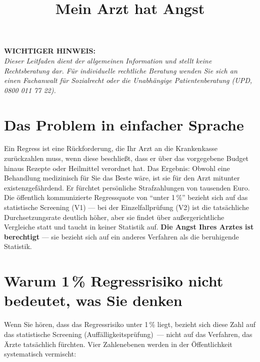 \documentclass[a4paper]{umbruch-position}
\title{Mein Arzt hat Angst}
\begin{document}
\maketitle

\begin{infobox}
\textbf{WICHTIGER HINWEIS:}\\
\textit{Dieser Leitfaden dient der allgemeinen Information und stellt keine Rechtsberatung dar. F\"ur individuelle rechtliche Beratung wenden Sie sich an einen Fachanwalt f\"ur Sozialrecht oder die Unabh\"angige Patientenberatung (UPD, 0800 011 77 22).}
\end{infobox}

\section{Das Problem in einfacher Sprache}

Ein \glqq{}Regress\grqq{} ist eine R\"uckforderung, die Ihr Arzt an die Krankenkasse zur\"uckzahlen muss, wenn diese beschlie\ss{}t, dass er \"uber das vorgegebene Budget hinaus Rezepte oder Heilmittel verordnet hat.
Das Ergebnis: Obwohl eine Behandlung medizinisch f\"ur Sie das Beste w\"are, ist sie f\"ur den Arzt mitunter existenzgef\"ahrdend. Er f\"urchtet pers\"onliche Strafzahlungen von tausenden Euro. Die \"offentlich kommunizierte Regressquote von ``unter 1\,\%'' bezieht sich auf das statistische Screening (V1) --- bei der Einzelfallpr\"ufung (V2) ist die tats\"achliche Durchsetzungsrate deutlich h\"oher, aber sie findet \"uber au\ss{}ergerichtliche Vergleiche statt und taucht in keiner Statistik auf. \textbf{Die Angst Ihres Arztes ist berechtigt} --- sie bezieht sich auf ein anderes Verfahren als die beruhigende Statistik.

\section{Warum \glqq{}1\,\% Regressrisiko\grqq{} nicht bedeutet, was Sie denken}

Wenn Sie h\"oren, dass das Regressrisiko unter 1\,\% liegt, bezieht sich diese Zahl auf das statistische Screening (Auff\"alligkeitspr\"ufung)~--- nicht auf das Verfahren, das \"Arzte tats\"achlich f\"urchten. Vier Zahlenebenen werden in der \"Offentlichkeit systematisch vermischt:
\end{document}
